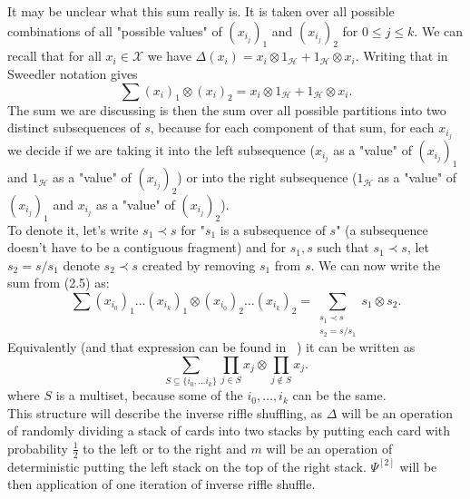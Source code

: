 \documentclass[a4paper, 12pt]{report}
\begin{document}
It may be unclear what this sum really is. It is taken over all possible combinations of all "possible
values" of $(x_{i_j})_1$ and $(x_{i_j})_2$ for $ 0 \leq j \leq k$. We can recall that for all
$x_i \in \mathcal{X}$ we
have $\Delta(x_i) = x_i \otimes 1_\mathcal{H} + 1_\mathcal{H} \otimes x_i$. Writing that in Sweedler
notation gives
\begin{equation*}
\sum(x_i)_1 \otimes (x_i)_2 = x_i \otimes 1_\mathcal{H} + 1_\mathcal{H} \otimes x_i.
\end{equation*}
The sum we are discussing is then the sum over all possible partitions into two distinct subsequences of $s$,
because for each component of that sum, for each $x_{i_j}$ we decide if we are taking it into the left
subsequence ($x_{i_j}$ as a "value" of $(x_{i_j})_1$ and $1_\mathcal{H}$ as a "value" of $(x_{i_j})_2$) or
into the right subsequence ($1_\mathcal{H}$ as a "value" of $(x_{i_j})_1$ and $x_{i_j}$ as a "value" of
$(x_{i_j})_2$).
\\ To denote it, let's write $s_1 \prec s$ for "$s_1$ is a subsequence of $s$" (a subsequence doesn't have
to be a contiguous fragment) and for $s_1, s$
such that $s_1 \prec s$, let $s_2 = s / s_1$ denote $s_2 \prec s$ created by removing
$s_1$ from $s$. We can now write the sum from (2.5) as:
\begin{equation*}
\sum (x_{i_0})_1 \dots (x_{i_k})_1 \otimes (x_{i_0})_2 \dots (x_{i_k})_2 =
\sum_{\substack{s_1 \prec s \\ s_2 = s / s_1}} s_1 \otimes s_2.
\end{equation*}
Equivalently (and that expression can be found in ~\cite{Diaconis2014}) it can be written as
\begin{equation*}
\sum_{S \subseteq \{ i_0, \dots i_k \} } \prod_{j \in S} x_j \otimes \prod_{j \notin S} x_j.
\end{equation*}
where $S$ is a multiset, because some of the $i_0, \dots, i_k$ can be the same. \\
\indent This structure will describe the inverse riffle shuffling, as $\Delta$ will be an operation of
randomly dividing a stack of cards into two stacks by putting each card with probability $\frac{1}{2}$ to
the left or to the right and $m$ will be an operation of deterministic putting the left stack on the top
of the right stack. $\Psi^{[2]}$ will be then application of one iteration of inverse riffle shuffle.
\end{document}
